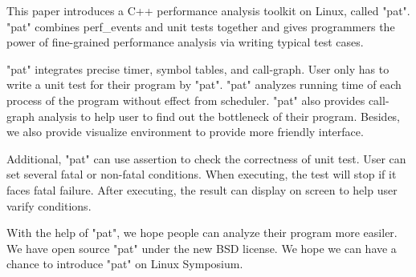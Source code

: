 This paper introduces a C++ performance analysis toolkit on Linux, called "pat".
"pat" combines perf_events and unit tests together and gives programmers the power of fine-grained performance analysis via writing typical test cases.

"pat" integrates precise timer, symbol tables, and call-graph. 
User only has to write a unit test for their program by "pat". 
"pat" analyzes running time of each process of the program without effect from scheduler. 
"pat" also provides call-graph analysis to help user to find out the bottleneck of their program. 
Besides, we also provide visualize environment to provide more friendly interface.

Additional, "pat" can use assertion to check the correctness of unit test. 
User can set several fatal or non-fatal conditions.
When executing, the test will stop if it faces fatal failure.
After executing, the result can display on screen to help user varify conditions.

With the help of "pat", we hope people can analyze their program more easiler.
We have open source "pat" under the new BSD license. 
We hope we can have a chance to introduce "pat" on Linux Symposium.
